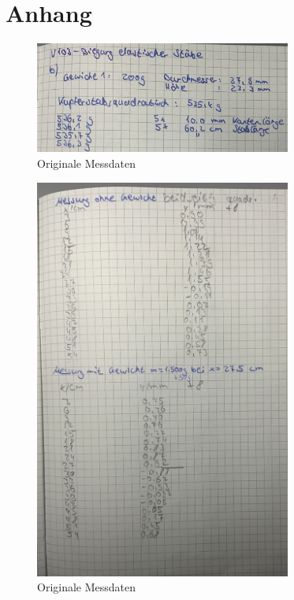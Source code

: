 \section{Anhang}
\label{sec:anhang}

\begin{figure}
  \centering
  \includegraphics[width=0.75\textwidth]{Dateien/Bild1.jpeg}
  \caption{Originale Messdaten}
  \label{fig:daten1}
\end{figure}

\begin{figure}
    \centering
    \includegraphics[width=0.75\textwidth]{Dateien/Bild2.jpeg}
    \caption{Originale Messdaten}
    \label{fig:daten2}
\end{figure}

